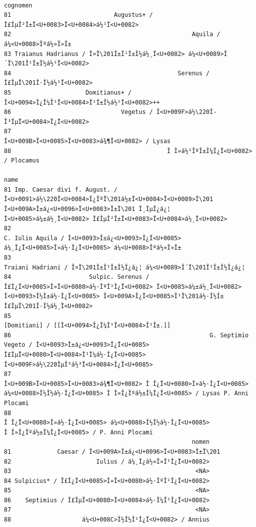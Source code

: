 \documentclass[a4paper,11pt]{memoir}
\begin{document}
\begin{verbatim}
                                                                         cognomen
81                             Augustus+ / Î£ÎµÎ²Î±Ï<U+0083>Ï<U+0084>á½¹Ï<U+0082>
82                                                   Aquila / á¼<U+0088>Îºá½»Î»Î±
83 Traianus Hadrianus / Î¤Ï\201Î±Î¹Î±Î½á½¸Ï<U+0082> á¼<U+0089>Î´Ï\201Î¹Î±Î½á½¹Ï<U+0082>
84                                               Serenus / Î£ÎµÏ\201Î·Î½á½¹Ï<U+0082>
85                     Domitianus+ / Î<U+0094>Î¿Î¼Î¹Ï<U+0084>Î¹Î±Î½á½¹Ï<U+0082>++
86                               Vegetus / Î<U+009F>á½\220Î­Î³ÎµÏ<U+0084>Î¿Ï<U+0082>
87                                Î<U+009B>Ï<U+0085>Ï<U+0083>á¾¶Ï<U+0082> / Lysas
88                                            Î Î»á½¹ÎºÎ±Î¼Î¿Ï<U+0082> / Plocamus
                                                                                                                                                                                            name
81 Imp. Caesar divi f. August. / Î<U+0091>á½\220Ï<U+0084>Î¿ÎºÏ\201á½±Ï<U+0084>Ï<U+0089>Ï\201 Î<U+009A>Î±á¿<U+0096>Ï<U+0083>Î±Ï\201 Î¸ÎµÎ¿á¿¦ Ï<U+0085>á¼±á½¸Ï<U+0082> Î£ÎµÎ²Î±Ï<U+0083>Ï<U+0084>á½¸Ï<U+0082>
82                                                                                         C. Iulio Aquila / Î<U+0093>Î±á¿<U+0093>Î¿Ï<U+0085> á¼¸Î¿Ï<U+0085>Î»á½·Î¿Ï<U+0085> á¼<U+0088>Îºá½»Î»Î±
83                                                                                                                                Traiani Hadriani / Î¤Ï\201Î±Î¹Î±Î½Î¿á¿¦ á¼<U+0089>Î´Ï\201Î¹Î±Î½Î¿á¿¦
84                      Sulpic. Serenus / Î£Î¿Ï<U+0085>Î»Ï<U+0080>á½·ÎºÎ¹Î¿Ï<U+0082> Ï<U+0085>á¼±á½¸Ï<U+0082> Î<U+0093>Î½Î±á½·Î¿Ï<U+0085> Î<U+009A>Î¿Ï<U+0085>Î¹Ï\201á½·Î½Î± Î£ÎµÏ\201Î·Î½á½¸Ï<U+0082>
85                                                                                                                                               [Domitiani] / [[Î<U+0094>Î¿Î¼Î¹Ï<U+0084>Î¹Î±.]]
86                                                        G. Septimio Vegeto / Î<U+0093>Î±á¿<U+0093>Î¿Ï<U+0085> Î£ÎµÏ<U+0080>Ï<U+0084>Î¹Î¼á½·Î¿Ï<U+0085> Î<U+009F>á½\220ÎµÎ³á½³Ï<U+0084>Î¿Ï<U+0085>
87                                           Î<U+009B>Ï<U+0085>Ï<U+0083>á¾¶Ï<U+0082> Î Î¿Ï<U+0080>Î»á½·Î¿Ï<U+0085> á¼<U+0088>Î½Î½á½·Î¿Ï<U+0085> Î Î»Î¿Îºá½±Î¼Î¿Ï<U+0085> / Lysas P. Anni Plocami
88                                                                                         Î Î¿Ï<U+0080>Î»á½·Î¿Ï<U+0085> á¼<U+0088>Î½Î½á½·Î¿Ï<U+0085> Î Î»Î¿Îºá½±Î¼Î¿Ï<U+0085> / P. Anni Plocami
                                                     nomen
81             Caesar / Î<U+009A>Î±á¿<U+0096>Ï<U+0083>Î±Ï\201
82                        Iulius / á¼¸Î¿á½»Î»Î¹Î¿Ï<U+0082>
83                                                    <NA>
84 Sulpicius* / Î£Î¿Ï<U+0085>Î»Ï<U+0080>á½·ÎºÎ¹Î¿Ï<U+0082>
85                                                    <NA>
86    Septimius / Î£ÎµÏ<U+0080>Ï<U+0084>á½·Î¼Î¹Î¿Ï<U+0082>
87                                                    <NA>
88                    á¼<U+008C>Î½Î½Î¹Î¿Ï<U+0082> / Annius
\end{verbatim}
\end{document}
